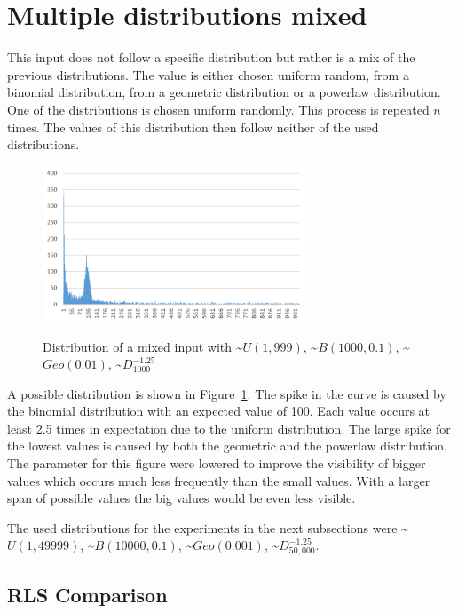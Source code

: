 \section{Multiple distributions mixed}
This input does not follow a specific distribution but rather is a mix of the previous distributions.
The value is either chosen uniform random, from a binomial distribution, from a geometric distribution  or a powerlaw distribution.
One of the distributions is chosen uniform randomly.
This process is repeated $n$ times.
The values of this distribution then follow neither of the used distributions.

\begin{figure}[h]
      \caption{Distribution of a mixed input with \textasciitilde$U(1,999)$, \textasciitilde$B(1000,0.1)$, \textasciitilde$Geo(0.01)$, \textasciitilde$D^{-1.25}_{1000}$}
      \centering
      \includegraphics[width=0.7\textwidth]{figures/images/numberGenerator/mixed.png}\label{fig:mixedDistExample}
\end{figure}

A possible distribution is shown in Figure~\ref{fig:mixedDistExample}.
The spike in the curve is caused by the binomial distribution with an expected value of 100.
Each value occurs at least 2.5 times in expectation due to the uniform distribution.
The large spike for the lowest values is caused by both the geometric and the powerlaw distribution.
The parameter for this figure were lowered to improve the visibility of bigger values which occurs much less frequently than the small values.
With a larger span of possible values the big values would be even less visible.

The used distributions for the experiments in the next subsections were \textasciitilde$U(1,49999)$, \textasciitilde$B(10000,0.1)$, \textasciitilde$Geo(0.001)$, \textasciitilde$D^{-1.25}_{50,000}$.
\subsection{RLS Comparison}



